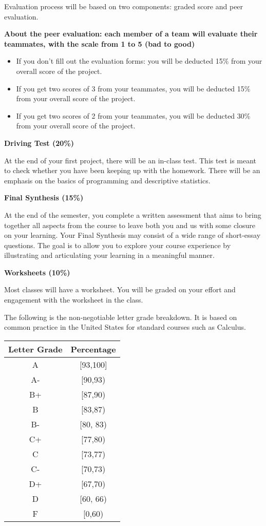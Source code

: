 \documentclass[
]{article}
\begin{document}
Evaluation process will be based on two components: graded score and peer evaluation.

\textbf{About the peer evaluation: each member of a team will evaluate their teammates, with the scale from 1 to 5 (bad to good)}

\begin{itemize}
\item
  If you don't fill out the evaluation forms: you will be deducted 15\% from your overall score of the project.
\item
  If you get two scores of 3 from your teammates, you will be deducted 15\% from your overall score of the project.
\item
  If you get two scores of 2 from your teammates, you will be deducted 30\% from your overall score of the project.
\end{itemize}

\textbf{Driving Test (20\%)}

At the end of your first project, there will be an in-class test. This test is meant to check whether you have been keeping up with the homework. There will be an emphasis on the basics of programming and descriptive statistics.

\textbf{Final Synthesis (15\%)}

At the end of the semester, you complete a written assessment that aims to bring together all aspects from the course to leave both you and us with some closure on your learning. Your Final Synthesis may consist of a wide range of short-essay questions. The goal is to allow you to explore your course experience by illustrating and articulating your learning in a meaningful manner.

\textbf{Worksheets (10\%)}

Most classes will have a worksheet. You will be graded on your effort and engagement with the worksheet in the class.

The following is the non-negotiable letter grade breakdown. It is based on
common practice in the United States for standard courses such as Calculus.

\begin{longtable}[]{@{}cc@{}}
\toprule\noalign{}
\textbf{Letter Grade} & \textbf{Percentage} \\
\midrule\noalign{}
\endhead
\bottomrule\noalign{}
\endlastfoot
A & {[}93,100{]} \\
A- & {[}90,93) \\
B+ & {[}87,90) \\
B & {[}83,87) \\
B- & {[}80, 83) \\
C+ & {[}77,80) \\
C & {[}73,77) \\
C- & {[}70,73) \\
D+ & {[}67,70) \\
D & {[}60, 66) \\
F & {[}0,60) \\
\end{longtable}
\end{document}
